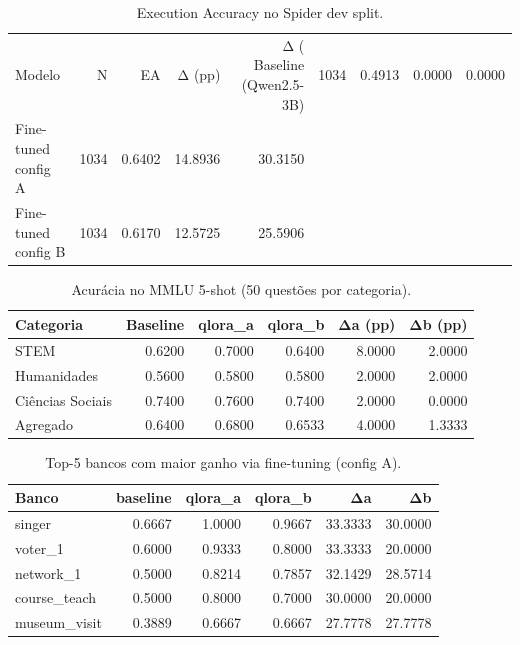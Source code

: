 \begin{table}[ht]
\centering
\caption{Execution Accuracy no Spider dev split.}
\label{tab:spider_ea}
\begin{tabular}{lrrrr}
\toprule
Modelo & N & EA & Δ (pp) & Δ (%
\midrule
Baseline (Qwen2.5-3B) & 1034 & 0.4913 & 0.0000 & 0.0000 \\
Fine-tuned config A & 1034 & 0.6402 & 14.8936 & 30.3150 \\
Fine-tuned config B & 1034 & 0.6170 & 12.5725 & 25.5906 \\
\bottomrule
\end{tabular}
\end{table}

\begin{table}[ht]
\centering
\caption{Acurácia no MMLU 5-shot (50 questões por categoria).}
\label{tab:mmlu}
\begin{tabular}{lrrrrr}
\toprule
Categoria & Baseline & qlora_a & qlora_b & Δa (pp) & Δb (pp) \\
\midrule
STEM & 0.6200 & 0.7000 & 0.6400 & 8.0000 & 2.0000 \\
Humanidades & 0.5600 & 0.5800 & 0.5800 & 2.0000 & 2.0000 \\
Ciências Sociais & 0.7400 & 0.7600 & 0.7400 & 2.0000 & 0.0000 \\
Agregado & 0.6400 & 0.6800 & 0.6533 & 4.0000 & 1.3333 \\
\bottomrule
\end{tabular}
\end{table}

\begin{table}[ht]
\centering
\caption{Top-5 bancos com maior ganho via fine-tuning (config A).}
\label{tab:per_db_top}
\begin{tabular}{lrrrrr}
\toprule
Banco & baseline & qlora_a & qlora_b & Δa & Δb \\
\midrule
singer & 0.6667 & 1.0000 & 0.9667 & 33.3333 & 30.0000 \\
voter\_1 & 0.6000 & 0.9333 & 0.8000 & 33.3333 & 20.0000 \\
network\_1 & 0.5000 & 0.8214 & 0.7857 & 32.1429 & 28.5714 \\
course\_teach & 0.5000 & 0.8000 & 0.7000 & 30.0000 & 20.0000 \\
museum\_visit & 0.3889 & 0.6667 & 0.6667 & 27.7778 & 27.7778 \\
\bottomrule
\end{tabular}
\end{table}

